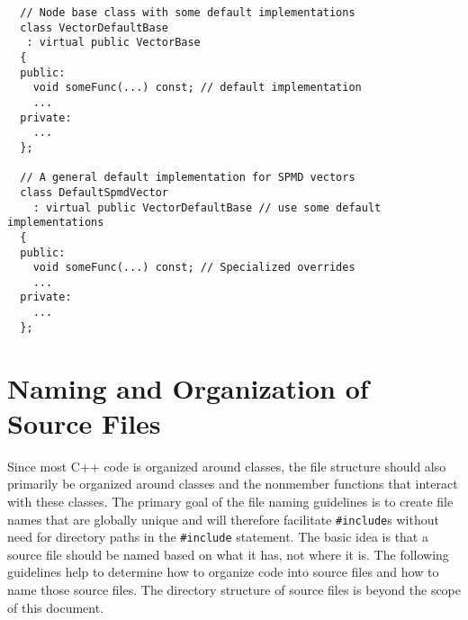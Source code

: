 \begin{enumerate}
{\begin{verbatim}
  // Node base class with some default implementations
  class VectorDefaultBase
   : virtual public VectorBase
  {
  public:
    void someFunc(...) const; // default implementation
    ...
  private:
    ...
  };

  // A general default implementation for SPMD vectors
  class DefaultSpmdVector
    : virtual public VectorDefaultBase // use some default implementations
  {
  public:
    void someFunc(...) const; // Specialized overrides
    ...
  private:
    ...
  };
\end{verbatim}}



\end{enumerate}

%
\section{Naming and Organization of Source Files}
%

Since most C++ code is organized around classes, the file structure should
also primarily be organized around classes and the nonmember functions that
interact with these classes.  The primary goal of the file naming guidelines
is to create file names that are globally unique and will therefore facilitate
{}\texttt{\#include}s without need for directory paths in the
{}\texttt{\#include} statement.  The basic idea is that a source file should be
named based on what it has, not where it is.  The following guidelines help to
determine how to organize code into source files and how to name those source
files.  The directory structure of source files is beyond the scope of this
document.

